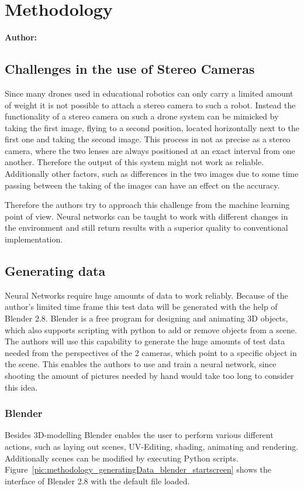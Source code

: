 \chapter{Methodology}

\textbf{Author: } 

\section{Challenges in the use of Stereo Cameras}
Since many drones used in educational robotics can only carry a limited amount of weight it is not possible to attach a stereo camera to such a robot. Instead the functionality of a stereo camera on such a drone system can be mimicked by taking the first image, flying to a second position, located horizontally next to the first one and taking the second image. This process in not as precise as a stereo camera, where the two lenses are always positioned at an exact interval from one another. Therefore the output of this system might not work as reliable. Additionally other factors, such as differences in the two images due to some time passing between the taking of the images can have an effect on the accuracy.

Therefore the authors try to approach this challenge from the machine learning point of view. Neural networks can be taught to work with different changes in the environment and still return results with a superior quality to conventional implementation.

\section{Generating data}
Neural Networks require huge amounts of data to work reliably. Because of the author's limited time frame this test data will be generated with the help of Blender 2.8. Blender is a free program for designing and animating 3D objects, which also supports scripting with python to add or remove objects from a scene. The authors will use this capability to generate the huge amounts of test data needed from the perspectives of the 2 cameras, which point to a specific object in the scene. This enables the authors to use and train a neural network, since shooting the amount of pictures needed by hand would take too long to consider this idea.

\subsection{Blender}
Besides 3D-modelling Blender enables the user to perform various different actions, such as laying out scenes, UV-Editing, shading, animating and rendering. Additionally scenes can be modified by executing Python scripts. Figure~\ref{pic:methodology_generatingData_blender_startscreen} shows the interface of Blender 2.8 with the default file loaded.

